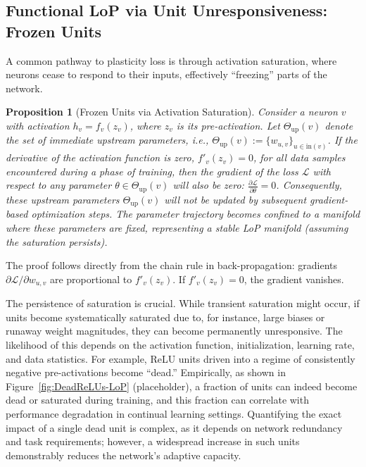 \documentclass{article}
\newcommand{\Loss}{\mathcal{L}}
\newtheorem{proposition}{Proposition}[section]
\begin{document}
\subsection{Functional LoP via Unit Unresponsiveness: Frozen Units}
\label{sec:frozen_units}
A common pathway to plasticity loss is through activation saturation, where neurons cease to respond to their inputs, effectively ``freezing'' parts of the network.

\begin{proposition}[Frozen Units via Activation Saturation]
\label{prop:saturated}
Consider a neuron $v$ with activation $h_v = f_v(z_v)$, where $z_v$ is its pre-activation. Let $\Theta_{\text{up}}(v)$ denote the set of immediate upstream parameters, i.e., $\Theta_{\text{up}}(v):=\{w_{u,v}\}_{u\in \text{in}(v)}$. If the derivative of the activation function is zero, $f'_v(z_v) = 0$, for all data samples encountered during a phase of training, then the gradient of the loss $\Loss$ with respect to any parameter $\theta \in \Theta_{\text{up}}(v)$ will also be zero: $\frac{\partial\Loss}{\partial\theta} = 0$.
Consequently, these upstream parameters $\Theta_{\text{up}}(v)$ will not be updated by subsequent gradient-based optimization steps. The parameter trajectory becomes confined to a manifold where these parameters are fixed, representing a stable LoP manifold (assuming the saturation persists).
\end{proposition}
The proof follows directly from the chain rule in back-propagation: gradients $\partial\Loss/\partial w_{u,v}$ are proportional to $f'_v(z_v)$. If $f'_v(z_v)=0$, the gradient vanishes.

The persistence of saturation is crucial. While transient saturation might occur, if units become systematically saturated due to, for instance, large biases or runaway weight magnitudes, they can become permanently unresponsive. The likelihood of this depends on the activation function, initialization, learning rate, and data statistics. For example, ReLU units driven into a regime of consistently negative pre-activations become ``dead.'' Empirically, as shown in Figure~\ref{fig:DeadReLUs-LoP} (placeholder), a fraction of units can indeed become dead or saturated during training, and this fraction can correlate with performance degradation in continual learning settings. Quantifying the exact impact of a single dead unit is complex, as it depends on network redundancy and task requirements; however, a widespread increase in such units demonstrably reduces the network's adaptive capacity.
\end{document}
